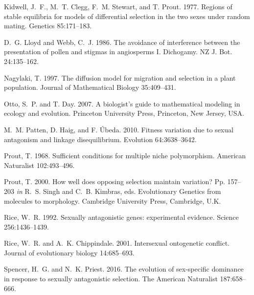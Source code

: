 \documentclass{article}
\begin{document}
\begin{thebibliography}{}
Kidwell, J.~F., M.~T. Clegg, F.~M. Stewart, and T. Prout. 1977.
\newblock Regions of stable equilibria for models of differential selection in the two sexes under random mating.
\newblock Genetics 85:171--183.

D.~G. Lloyd and Webb, C.~J. 1986.
\newblock The avoidance of interference between the presentation of pollen and stigmas in angiosperms I. Dichogamy.
\newblock NZ J. Bot. 24:135--162.

Nagylaki, T. 1997.
\newblock The diffusion model for migration and selection in a plant population.
\newblock Journal of Mathematical Biology 35:409--431.

Otto, S.~P. and T. Day. 2007.
\newblock A biologist's guide to mathematical modeling in ecology and evolution.
\newblock Princeton University Press, Princeton, New Jersey, USA.

M.~M. Patten, D. Haig, and F. \'{U}beda. 2010.
\newblock Fitness variation due to sexual antagonism and linkage disequilibrium.
\newblock Evolution 64:3638--3642.

Prout, T. 1968.
\newblock Sufficient conditions for multiple niche polymorphism.
\newblock American Naturalist 102:493--496.

Prout, T. 2000.
\newblock How well does opposing selection maintain variation?
\newblock Pp. 157--203 \textit{in} R.~S. Singh and C.~B. Kimbras, eds. Evolutionary Genetics from molecules to morphology. Cambridge University Press, Cambridge, U.K.

Rice, W.~R. 1992.
\newblock Sexually antagonistic genes: experimental evidence.
\newblock Science 256:1436--1439.

Rice, W.~R. and A.~K. Chippindale. 2001.
\newblock Intersexual ontogenetic conflict.
\newblock Journal of evolutionary biology 14:685--693.

Spencer, H.~G. and N.~K. Priest. 2016.
\newblock The evolution of sex-specific dominance in response to sexually antagonistic selection.
\newblock The American Naturalist 187:658--666.


\end{thebibliography}
\end{document}
